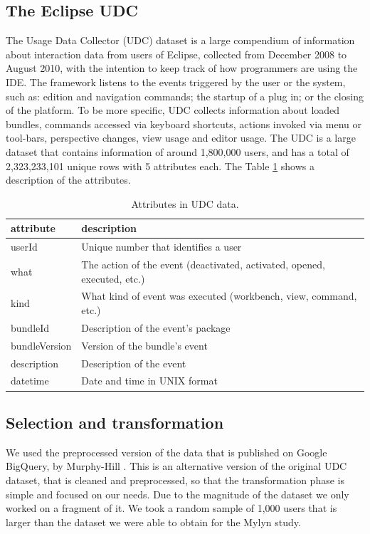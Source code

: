 \documentclass[times]{smrauth}
\begin{document}
\subsection{The Eclipse UDC}
The Usage Data Collector (UDC) dataset is a large compendium of information about interaction data from users of Eclipse, collected from December 2008 to August 2010, with the intention to keep track of how programmers are using the IDE. The framework listens to the events triggered by the user or the system, such as: edition and navigation commands; the startup of a plug in; or the closing of the platform. To be more specific, UDC collects information about loaded bundles, commands accessed via keyboard shortcuts, actions invoked via menu or tool-bars, perspective changes, view usage and editor usage. The UDC is a large dataset that contains information of around 1,800,000 users, and has a total of 2,323,233,101 unique rows with 5 attributes each. The Table \ref{tbl:att_udc} shows a description of the attributes.


\begin{table}[ht!]
\tiny
\renewcommand{\arraystretch}{1.3}
\caption{Attributes in UDC data. }
\label{tbl:att_udc}
\centering
\begin{tabular}{|p{2.5cm}|p{7cm}|} 
  \hline 
attribute & description \\  
  \hline 
    \hline 
userId &  Unique number that identifies a user \\
what & The action of the event (deactivated, activated, opened, executed, etc.)  \\
kind & What kind of event was executed (workbench, view, command, etc.)  \\
bundleId & Description of the event's package  \\
bundleVersion & Version of the bundle's event  \\
description & Description of the event\\
datetime & Date and time in UNIX format\\
  \hline
\end{tabular}

\end{table}

\subsection{Selection and transformation}
We used the preprocessed version of the data that is published on Google BigQuery, by Murphy-Hill \cite{SnipesETALASD}. This is an alternative version of the original UDC dataset, that is cleaned and preprocessed, so that the transformation phase is simple and focused on our needs. Due to the magnitude of the dataset we only worked on a fragment of it. We took a random sample of 1,000 users that is larger than the dataset we were able to obtain for the Mylyn study.
\end{document}
